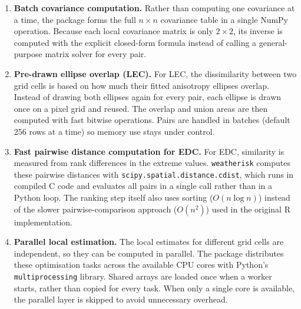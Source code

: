 \documentclass[preprint,12pt,a4paper]{elsarticle}
\newcommand{\revo}[1]{{\color{RevisionOrange}#1}}
\begin{document}
\begin{enumerate}
\item \textbf{Batch covariance computation.}
  \revo{Rather than computing one covariance at a time, the package
  forms the full $n \times n$ covariance table in a single NumPy
  operation. Because each local covariance matrix is only $2\times 2$,
  its inverse is computed with the explicit closed-form formula
  instead of calling a general-purpose matrix solver for every pair.}

\item \textbf{Pre-drawn ellipse overlap (LEC).}
  \revo{For LEC, the dissimilarity between two grid cells is based on
  how much their fitted anisotropy ellipses overlap. Instead of
  drawing both ellipses again for every pair, each ellipse is drawn
  once on a pixel grid and reused. The overlap and union areas are
  then computed with fast bitwise operations. Pairs are handled in
  batches (default 256 rows at a time) so memory use stays under
  control.}

\item \textbf{Fast pairwise distance computation for EDC.}
  \revo{For EDC, similarity is measured from rank differences in the
  extreme values. \texttt{weatherisk} computes these pairwise
  distances with \texttt{scipy.spatial.distance.\allowbreak{}cdist},
  which runs in compiled C code and evaluates all pairs in a single
  call rather than in a Python loop. The ranking step itself also uses sorting
  ($O(n \log n)$) instead of the slower pairwise-comparison approach
  ($O(n^2)$) used in the original R implementation.}

\item \textbf{Parallel local estimation.}
  \revo{The local estimates for different grid cells are independent,
  so they can be computed in parallel. The package distributes these
  optimisation tasks across the available CPU cores with Python's
  \texttt{multiprocessing} library. Shared arrays are loaded once when
  a worker starts, rather than copied for every task. When only a
  single core is available, the parallel layer is skipped to avoid
  unnecessary overhead.}
\end{enumerate}

%
%
\end{document}
